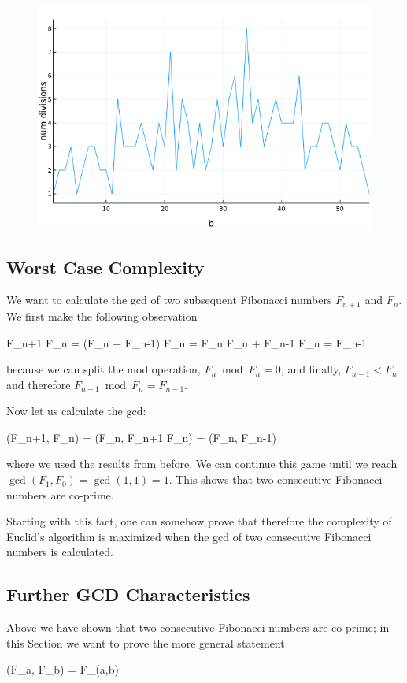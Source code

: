 \begin{figure}[H]
	\includegraphics[scale=0.5]{images/gcd_num_div.png}
\end{figure}


\subsection{Worst Case Complexity}

We want to calculate the gcd of two subsequent Fibonacci numbers $F_{n+1}$ and $F_n$. We first make the following observation

\bee
F_{n+1} \bmod F_n = (F_n + F_{n-1}) \bmod F_n = F_n \bmod F_n + F_{n-1} \bmod F_n = F_{n-1}
\eee

because we can split the mod operation, $F_n \bmod F_n = 0$, and finally, $F_{n-1} < F_n$ and therefore $F_{n-1} \bmod F_n = F_{n-1}$.

Now let us calculate the gcd:

\bee
\gcd(F_{n+1}, F_n) = \gcd(F_n, F_{n+1} \bmod F_n) = \gcd(F_n, F_{n-1})
\eee

where we used the results from before. We can continue this game until we reach $\gcd(F_1, F_0) = \gcd(1,1) = 1$. This shows that two consecutive Fibonacci numbers are co-prime.

Starting with this fact, one can somehow prove that therefore the complexity of Euclid's algorithm is maximized when the gcd of two consecutive Fibonacci numbers is calculated.


\subsection{Further GCD Characteristics}

Above we have shown that two consecutive Fibonacci numbers are co-prime; in this Section we want to prove the more general statement

\bee
\gcd(F_a, F_b) = F_{\gcd(a,b)}
\eee


